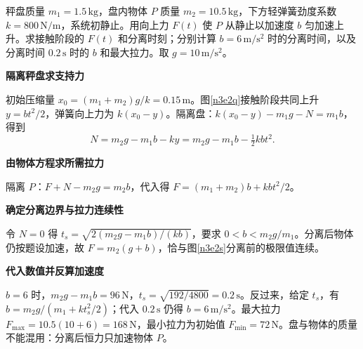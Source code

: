 \begin{question}\begin{example}[向上匀加速提离弹簧秤盘]\label{n3e2}
秤盘质量 $m_1=1.5\,\mathrm{kg}$，盘内物体 $P$ 质量 $m_2=10.5\,\mathrm{kg}$，下方轻弹簧劲度系数 $k=800\,\mathrm{N/m}$，系统初静止。用向上力 $F(t)$ 使 $P$ 从静止以加速度 $b$ 匀加速上升。求接触阶段的 $F(t)$ 和分离时刻；分别计算 $b=6\,\mathrm{m/s^2}$ 时的分离时间，以及分离时间 $0.2\,\mathrm s$ 时的 $b$ 和最大拉力。取 $g=10\,\mathrm{m/s^2}$。
\end{example}\end{question}
\begin{solution}\textbf{隔离秤盘求支持力}\par\nobreak
初始压缩量 $x_0=(m_1+m_2)g/k=0.15\,\mathrm m$。图\ref{n3e2q}接触阶段共同上升 $y=bt^2/2$，弹簧向上力为 $k(x_0-y)$。隔离盘：$k(x_0-y)-m_1g-N=m_1b$，得到
\[N=m_2g-m_1b-ky=m_2g-m_1b-\tfrac12kbt^2.\]


\par\medskip{}\noindent\textbf{由物体方程求所需拉力}\par\nobreak
隔离 $P$：$F+N-m_2g=m_2b$，代入得 $F=(m_1+m_2)b+kbt^2/2$。



\par\medskip{}\noindent\textbf{确定分离边界与拉力连续性}\par\nobreak
令 $N=0$ 得 $t_s=\sqrt{2(m_2g-m_1b)/(kb)}$，要求 $0<b<m_2g/m_1$。分离后物体仍按题设加速，故 $F=m_2(g+b)$，恰与图\ref{n3e2s}分离前的极限值连续。



\par\medskip{}\noindent\textbf{代入数值并反算加速度}\par\nobreak
$b=6$ 时，$m_2g-m_1b=96\,\mathrm N$，$t_s=\sqrt{192/4800}=0.2\,\mathrm s$。反过来，给定 $t_s$，有 $b=m_2g/(m_1+kt_s^2/2)$；代入 $0.2\,\mathrm s$ 仍得 $b=6\,\mathrm{m/s^2}$。最大拉力 $F_{\max}=10.5(10+6)=168\,\mathrm N$，最小拉力为初始值 $F_{\min}=72\,\mathrm N$。盘与物体的质量不能混用：分离后恒力只加速物体 $P$。
\end{solution}

